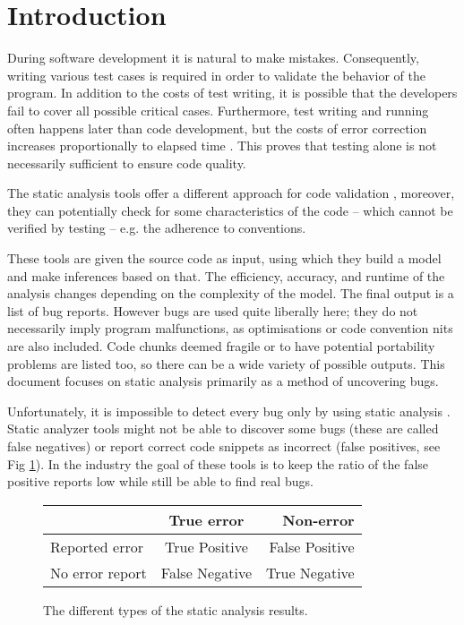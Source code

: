 
\section{Introduction}
During software development it is natural to make mistakes. Consequently,
writing various test cases is required in order to validate the behavior
of the program. In addition to the costs of test writing, it is possible that the developers fail
to cover all possible critical cases. Furthermore, test writing and running
often happens later than code development, but the costs of error correction
increases proportionally to elapsed time  \cite{fixcost}. This proves that 
testing alone is not necessarily sufficient to ensure code quality.  %

The static analysis tools offer a different approach for code validation 
\cite{Zhivich2009} \cite{Bessey2010}, moreover, they can potentially check for 
some characteristics of the code -- which cannot be verified by testing -- e.g. 
the adherence to conventions.

These tools are given the source code as input, using which they build a model 
and make inferences based on that. The efficiency, accuracy, and runtime of the 
analysis changes depending on the complexity of the model.
The final output is a list of bug reports. However bugs are used quite 
liberally here; they do not necessarily imply program malfunctions, as 
optimisations or code convention nits are also included. Code chunks deemed 
fragile or to have potential portability problems are listed too, so there can 
be a wide variety of possible outputs.
This document focuses on static analysis primarily as a method of uncovering 
bugs.
 
Unfortunately, it is impossible to detect every 
bug only by using static analysis \cite{Rice:53}. Static analyzer tools might 
not be able to discover some bugs (these are called false negatives) or report 
correct code snippets as incorrect (false positives, see Fig \ref{fig:bes}). In 
the industry the goal of these tools is to keep the ratio of the false positive 
reports low while still be able to find real bugs.

\begin{figure}[!h]
	\begin{center}
		\begin{tabular}{ | l | c | r | }
			\hline
			& True error   & Non-error \\ \hline
			Reported error   & True Positive  & False Positive   \\ \hline
			No error report & False Negative & True Negative    \\
			\hline
		\end{tabular}
	\end{center}
	\caption{The different types of the static analysis results.}
	\label{fig:bes}
\end{figure}

